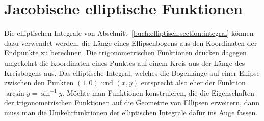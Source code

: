 %
%
%
\section{Jacobische elliptische Funktionen
\label{buch:elliptisch:section:jacobi}}
Die elliptischen Integrale von
Abschnitt~\ref{buch:elliptisch:section:integral}
können dazu verwendet werden, die Länge eines Ellipsenbogens aus
den Koordinaten der Endpunkte zu berechnen.
Die trigonometrischen Funktionen drücken dagegen umgekehrt die
Koordinaten eines Punktes auf einem Kreis aus der Länge des
Kreisbogens aus.
Das elliptische Integral, welches die Bogenlänge auf einer Ellipse zwischen
den Punkten $(1,0)$ und $(x,y)$ entsprecht also eher der Funktion
$\arcsin y=\sin^{-1}y$.
Möchte man Funktionen konstruieren, die die Eigenschaften der 
trigonometrischen Funktionen auf die Geometrie von Ellipsen erweitern,
dann muss man die Umkehrfunktionen der elliptischen Integrale dafür ins
Auge fassen.




